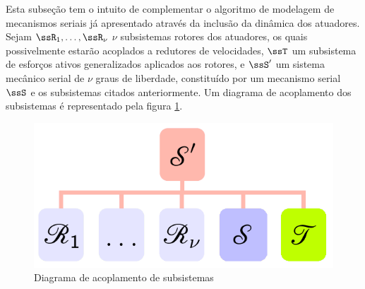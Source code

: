 \documentclass[]{politex}
\begin{document}
Esta subseção tem o intuito de complementar o algoritmo de modelagem de mecanismos seriais já apresentado através da inclusão da dinâmica dos atuadores. \\ 

Sejam $\ssR_1,\hdots,\ssR_\nu$ $\nu$ subsistemas rotores dos atuadores, os quais possivelmente estarão acoplados a redutores de velocidades, $\ssT$ um subsistema de esforços ativos generalizados aplicados aos rotores,  e $\ssS'$ um sistema mecânico serial de $\nu$ graus de liberdade, constituído por um mecanismo serial $\ssS$ e os subsistemas citados anteriormente. Um diagrama de acoplamento dos subsistemas é representado pela figura \ref{fig:AcoplamentoMecSerialRotores}.
\begin{figure}[h]
	\centering
	\includegraphics[scale=0.42]{imagens/DiagramaAcoplamentoMecSerialRotores.png}  
	\caption{Diagrama de acoplamento de subsistemas}
	\label{fig:AcoplamentoMecSerialRotores}
\end{figure}
\end{document}
